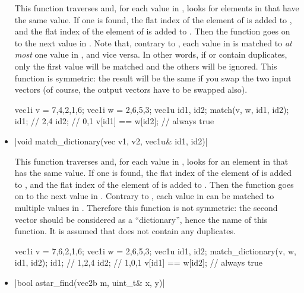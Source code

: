 \documentclass[12pt]{report}
\newenvironment{example}
{
    \begin{mdframed}[style=example,frametitle={Example}]
}
{
    \end{mdframed}
}
\begin{document}
\begin{itemize}
This function traverses  and, for each value in , looks for elements in  that have the same value. If one is found, the flat index of the element of  is added to , and the flat index of the element of  is added to . Then the function goes on to the next value in . Note that, contrary to , each value in  is matched to \emph{at most} one value in , and vice versa. In other words, if  or  contain duplicates, only the first value will be matched and the others will be ignored. This function is symmetric: the result will be the same if you swap the two input vectors (of course, the output vectors have to be swapped also).

\begin{example}
\begin{cppcode}
vec1i v = {7,4,2,1,6};
vec1i w = {2,6,5,3};
vec1u id1, id2;
match(v, w, id1, id2);
id1; // {2,4}
id2; // {0,1}
v[id1] == w[id2]; // always true
\end{cppcode}
\end{example}

\item \cppinline|void match_dictionary(vec v1, v2, vec1u& id1, id2)| 

This function traverses  and, for each value in , looks for an element in  that has the same value. If one is found, the flat index of the element of  is added to , and the flat index of the element of  is added to . Then the function goes on to the next value in . Contrary to , each value in  can be matched to multiple values in . Therefore this function is not symmetric: the second vector should be considered as a ``dictionary'', hence the name of this function. It is assumed that  does not contain any duplicates.

\begin{example}
\begin{cppcode}
vec1i v = {7,6,2,1,6};
vec1i w = {2,6,5,3};
vec1u id1, id2;
match_dictionary(v, w, id1, id2);
id1; // {1,2,4}
id2; // {1,0,1}
v[id1] == w[id2]; // always true
\end{cppcode}
\end{example}

\item \cppinline|bool astar_find(vec2b m, uint_t& x, y)| 


\end{itemize}
\end{document}
